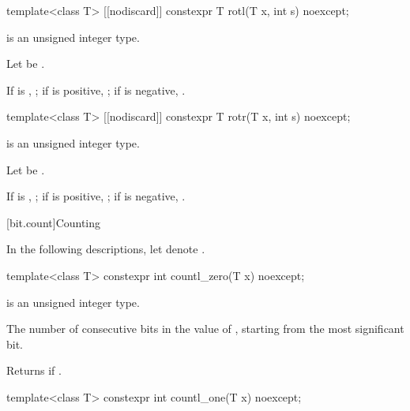 \begin{itemdecl}
template<class T>
  [[nodiscard]] constexpr T rotl(T x, int s) noexcept;
\end{itemdecl}

%
\begin{itemdescr}
\pnum
\constraints
{} is an unsigned integer type.

\pnum
Let  be .

\pnum
\returns
If  is , ;
if  is positive, ;
if  is negative, .
\end{itemdescr}

\begin{itemdecl}
template<class T>
  [[nodiscard]] constexpr T rotr(T x, int s) noexcept;
\end{itemdecl}

%
\begin{itemdescr}
\pnum
\constraints
{} is an unsigned integer type.

\pnum
Let  be .

\pnum
\returns
If  is , ;
if  is positive, ;
if  is negative, .
\end{itemdescr}

[bit.count]{Counting}

In the following descriptions,
let  denote .

\begin{itemdecl}
template<class T>
  constexpr int countl_zero(T x) noexcept;
\end{itemdecl}

%
\begin{itemdescr}
\pnum
\constraints
{} is an unsigned integer type.

\pnum
\returns
The number of consecutive  bits in the value of ,
starting from the most significant bit.
\begin{note}
Returns  if .
\end{note}
\end{itemdescr}

\begin{itemdecl}
template<class T>
  constexpr int countl_one(T x) noexcept;
\end{itemdecl}

